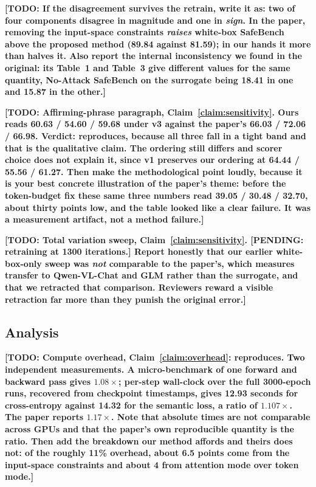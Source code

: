 \documentclass[10pt]{article} %
\newcommand{\todo}[1]{\textbf{[TODO: #1]}}
\newcommand{\pending}[1]{\textbf{[PENDING: #1]}}   %
\begin{document}
\todo{If the disagreement survives the retrain, write it as: two of four components disagree in magnitude and one in \emph{sign}. In the paper, removing the input-space constraints \emph{raises} white-box SafeBench above the proposed method (89.84 against 81.59); in our hands it more than halves it. Also report the internal inconsistency we found in the original: its Table~1 and Table~3 give different values for the same quantity, No-Attack SafeBench on the surrogate being 18.41 in one and 15.87 in the other.}

\todo{Affirming-phrase paragraph, Claim~\ref{claim:sensitivity}. Ours reads 60.63 / 54.60 / 59.68 under v3 against the paper's 66.03 / 72.06 / 66.98. Verdict: reproduces, because all three fall in a tight band and that is the qualitative claim. The ordering still differs and scorer choice does not explain it, since v1 preserves our ordering at 64.44 / 55.56 / 61.27. Then make the methodological point loudly, because it is your best concrete illustration of the paper's theme: before the token-budget fix these same three numbers read 39.05 / 30.48 / 32.70, about thirty points low, and the table looked like a clear failure. It was a measurement artifact, not a method failure.}

\todo{Total variation sweep, Claim~\ref{claim:sensitivity}. \pending{retraining at 1300 iterations.} Report honestly that our earlier white-box-only sweep was \emph{not} comparable to the paper's, which measures transfer to Qwen-VL-Chat and GLM rather than the surrogate, and that we retracted that comparison. Reviewers reward a visible retraction far more than they punish the original error.}

\subsection{Analysis}
\label{sec:results-analysis}

\todo{Compute overhead, Claim~\ref{claim:overhead}: reproduces. Two independent measurements. A micro-benchmark of one forward and backward pass gives $1.08\times$; per-step wall-clock over the full 3000-epoch runs, recovered from checkpoint timestamps, gives 12.93 seconds for cross-entropy against 14.32 for the semantic loss, a ratio of $1.107\times$. The paper reports $1.17\times$. Note that absolute times are not comparable across GPUs and that the paper's own reproducible quantity is the ratio. Then add the breakdown our method affords and theirs does not: of the roughly 11\% overhead, about 6.5 points come from the input-space constraints and about 4 from attention mode over token mode.}
\end{document}
